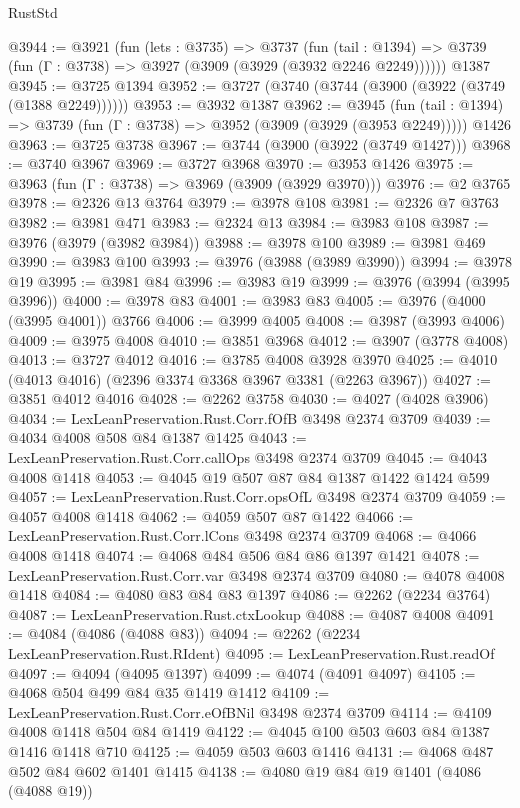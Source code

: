 \begin{lexlean}{RustStd}
\begin{coremodule}
@3944 := @3921
    (fun (lets : @3735) =>
    @3737
      (fun (tail : @1394) => @3739 (fun (Γ : @3738) => @3927 (@3909 (@3929 (@3932 @2246 @2249))))))
    @1387
@3945 := @3725 @1394
@3952 := @3727 (@3740 (@3744 (@3900 (@3922 (@3749 (@1388 @2249))))))
@3953 := @3932 @1387
@3962 := @3945
    (fun (tail : @1394) => @3739 (fun (Γ : @3738) => @3952 (@3909 (@3929 (@3953 @2249)))))
    @1426
@3963 := @3725 @3738
@3967 := @3744 (@3900 (@3922 (@3749 @1427)))
@3968 := @3740 @3967
@3969 := @3727 @3968
@3970 := @3953 @1426
@3975 := @3963 (fun (Γ : @3738) => @3969 (@3909 (@3929 @3970)))
@3976 := @2 @3765
@3978 := @2326 @13 @3764
@3979 := @3978 @108
@3981 := @2326 @7 @3763
@3982 := @3981 @471
@3983 := @2324 @13
@3984 := @3983 @108
@3987 := @3976 (@3979 (@3982 @3984))
@3988 := @3978 @100
@3989 := @3981 @469
@3990 := @3983 @100
@3993 := @3976 (@3988 (@3989 @3990))
@3994 := @3978 @19
@3995 := @3981 @84
@3996 := @3983 @19
@3999 := @3976 (@3994 (@3995 @3996))
@4000 := @3978 @83
@4001 := @3983 @83
@4005 := @3976 (@4000 (@3995 @4001)) @3766
@4006 := @3999 @4005
@4008 := @3987 (@3993 @4006)
@4009 := @3975 @4008
@4010 := @3851 @3968
@4012 := @3907 (@3778 @4008)
@4013 := @3727 @4012
@4016 := @3785 @4008 @3928 @3970
@4025 := @4010 (@4013 @4016) (@2396 @3374 @3368 @3967 @3381 (@2263 @3967))
@4027 := @3851 @4012 @4016
@4028 := @2262 @3758
@4030 := @4027 (@4028 @3906)
@4034 := LexLeanPreservation.Rust.Corr.fOfB @3498 @2374 @3709
@4039 := @4034 @4008 @508 @84 @1387 @1425
@4043 := LexLeanPreservation.Rust.Corr.callOps @3498 @2374 @3709
@4045 := @4043 @4008 @1418
@4053 := @4045 @19 @507 @87 @84 @1387 @1422 @1424 @599
@4057 := LexLeanPreservation.Rust.Corr.opsOfL @3498 @2374 @3709
@4059 := @4057 @4008 @1418
@4062 := @4059 @507 @87 @1422
@4066 := LexLeanPreservation.Rust.Corr.lCons @3498 @2374 @3709
@4068 := @4066 @4008 @1418
@4074 := @4068 @484 @506 @84 @86 @1397 @1421
@4078 := LexLeanPreservation.Rust.Corr.var @3498 @2374 @3709
@4080 := @4078 @4008 @1418
@4084 := @4080 @83 @84 @83 @1397
@4086 := @2262 (@2234 @3764)
@4087 := LexLeanPreservation.Rust.ctxLookup
@4088 := @4087 @4008
@4091 := @4084 (@4086 (@4088 @83))
@4094 := @2262 (@2234 LexLeanPreservation.Rust.RIdent)
@4095 := LexLeanPreservation.Rust.readOf
@4097 := @4094 (@4095 @1397)
@4099 := @4074 (@4091 @4097)
@4105 := @4068 @504 @499 @84 @35 @1419 @1412
@4109 := LexLeanPreservation.Rust.Corr.eOfBNil @3498 @2374 @3709
@4114 := @4109 @4008 @1418 @504 @84 @1419
@4122 := @4045 @100 @503 @603 @84 @1387 @1416 @1418 @710
@4125 := @4059 @503 @603 @1416
@4131 := @4068 @487 @502 @84 @602 @1401 @1415
@4138 := @4080 @19 @84 @19 @1401 (@4086 (@4088 @19))

\end{coremodule}
\end{lexlean}

